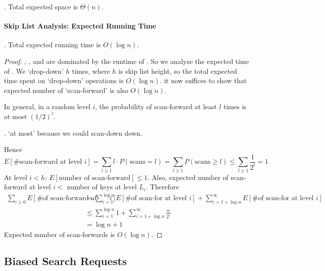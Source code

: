 \documentclass{article}
\begin{document}
\begin{result}[].
    Total expected space is $\Theta(n)$. 
\end{result}

\paragraph{Skip List Analysis: Expected Running Time} 

\begin{thmm}[].
    Total expected running time is $O(\log n)$. 
\end{thmm}

\begin{proof}
    , , and  are dominated by the runtime of . So we analyze the expected time of . We ‘drop-down’ $h$ times, where $h$ is skip list height, so the total expected time spent on ‘drop-down’ operations is $O(\log n)$. it now suffices to show that expected number of ‘scan-forward’ is also $O(\log n)$. 

    In general, in a random level $i$, the probability of scan-forward at least $l$ times is at most $(1/2)^l$. 
    \begin{comm}[].
        ‘at most’ because we could scan-down down. 
    \end{comm}
    Hence 
    \[ E[\text{\# scan-forward at level } i] = \sum_{l \geq 1} l \cdot P(\text{scans} = l) = \sum_{l \geq 1} P(\text{scans} \geq l) \leq \sum_{l \geq 1} \frac{1}{2^l} = 1 \]
    At level $i < h$: $E[\text{number of scan-forward}] \leq 1$. Also, expected number of scan-forward at level $i <$ number of keys at level $L_i$. Therefore \begin{align*}
        \sum_{i \geq 0} E[\text{\# of scan-forward at level } i] 
        & = \sum_{i=1}^{\log n} E[\text{\# of scan-for at level } i] + \sum_{i=1+\log n}^{\infty} E[\text{\# of scan-for at level } i] \\ 
        & \leq \sum_{i=1}^{\log n} 1 + \sum_{i=1+\log n}^{\infty} \frac{n}{2^i} \\
        & = \log n + 1
    \end{align*}
    Expected number of scan-forwards is $O(\log n)$.  
\end{proof}

\subsection{Biased Search Requests}
\end{document}
